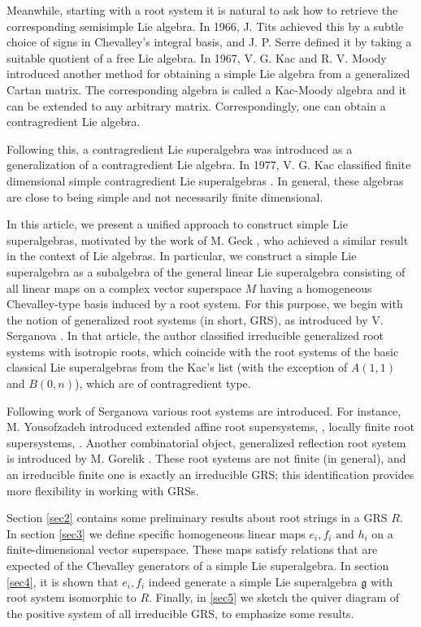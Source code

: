 \documentclass[11pt]{amsart}
\theoremstyle{plain}
\theoremstyle{definition}
\numberwithin{equation}{section}
\newcommand{\g}{\mathfrak{g}}
\begin{document}
Meanwhile, starting with a root system it is natural to ask  how to retrieve the corresponding semisimple Lie algebra. In 1966, J. Tits achieved this by a subtle choice of signs in Chevalley's integral basis, and J. P. Serre defined it by taking a suitable quotient of a free Lie algebra. In 1967, V. G. Kac and R. V. Moody introduced another method for obtaining a simple Lie algebra from a generalized Cartan matrix. The corresponding algebra is called a Kac-Moody algebra and it can be extended to any arbitrary matrix. Correspondingly, one can obtain a contragredient Lie algebra.
	
	Following this, a contragredient Lie superalgebra was introduced as a generalization of a contragredient Lie algebra. In 1977, V. G. Kac classified finite dimensional simple contragredient Lie superalgebras \cite{kac1977lie, kac1977sketch}. In general, these algebras are close to being simple and not necessarily finite dimensional. 
	
	In this article, we present a unified approach to construct simple Lie superalgebras, motivated by the work of M. Geck \cite{geck2017construction}, who achieved a similar result in the context of Lie algebras. In particular, we construct a simple Lie superalgebra as a subalgebra of the general linear Lie superalgebra consisting of all linear maps on a complex vector superspace $M$ having a homogeneous Chevalley-type basis induced by a root system. For this purpose, we begin with the notion of generalized root systems (in short, GRS), as introduced by V. Serganova  \cite{serganova1996generalizations}. In that article, the author classified irreducible generalized root systems with isotropic roots, which coincide with the root systems of the basic classical Lie superalgebras from the Kac's list (with the exception of $A(1, 1)$ and $B(0, n)$), which are of contragredient type.
	
	Following work of Serganova various root systems are introduced. For instance, M. Yousofzadeh introduced extended affine root supersystems, \cite{yousofzadeh2016extended}, locally finite root supersystems, \cite{yousofzadeh2017locally}. Another combinatorial object, generalized reflection root system is introduced by M. Gorelik \cite{gorelik2017generalized}. These root systems are not finite (in general), and an irreducible finite one is exactly an irreducible GRS; this identification provides more flexibility in working with GRSs. 
	
	Section \ref{sec2} contains some preliminary results about root strings in a GRS $R$. In section \ref{sec3} we define specific homogeneous linear maps $e_i,f_i\text{ and }h_i$ on a finite-dimensional vector superspace. These maps satisfy relations that are expected of the Chevalley generators of a simple Lie superalgebra. In section \ref{sec4}, it is shown that $e_i,f_i$ indeed generate a simple Lie superalgebra $\g$ with root system isomorphic to $R$. Finally, in \ref{sec5} we sketch the quiver diagram of the positive system of all irreducible GRS, to emphasize some results.
	
\end{document}

